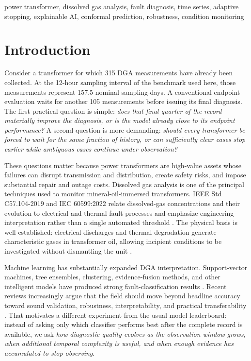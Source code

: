 \documentclass[conference]{IEEEtran}
\begin{document}
\begin{IEEEkeywords}
power transformer, dissolved gas analysis, fault diagnosis, time series, adaptive stopping, explainable AI, conformal prediction, robustness, condition monitoring
\end{IEEEkeywords}

\section{Introduction}
Consider a transformer for which 315 DGA measurements have already been collected. At the 12-hour sampling interval of the benchmark used here, those measurements represent 157.5 nominal sampling-days. A conventional endpoint evaluation waits for another 105 measurements before issuing its final diagnosis. The first practical question is simple: \emph{does that final quarter of the record materially improve the diagnosis, or is the model already close to its endpoint performance?} A second question is more demanding: \emph{should every transformer be forced to wait for the same fraction of history, or can sufficiently clear cases stop earlier while ambiguous cases continue under observation?}

These questions matter because power transformers are high-value assets whose failures can disrupt transmission and distribution, create safety risks, and impose substantial repair and outage costs. Dissolved gas analysis is one of the principal techniques used to monitor mineral-oil-immersed transformers. IEEE Std C57.104-2019 and IEC 60599:2022 relate dissolved-gas concentrations and their evolution to electrical and thermal fault processes and emphasize engineering interpretation rather than a single automated threshold \cite{ieeeC57104,iec60599}. The physical basis is well established: electrical discharges and thermal degradation generate characteristic gases in transformer oil, allowing incipient conditions to be investigated without dismantling the unit \cite{rogers1978,cheng2018survey,ali2023review,nanfak2024review}.

Machine learning has substantially expanded DGA interpretation. Support-vector machines, tree ensembles, clustering, evidence-fusion methods, and other intelligent models have produced strong fault-classification results \cite{zhang2019khsvm,shang2019hmsvm,liu2020dbscan,hechifa2024ensemble,lv2024lightgbm,zhang2022copula}. Recent reviews increasingly argue that the field should move beyond headline accuracy toward sound validation, robustness, interpretability, and practical transferability \cite{bouzar2026robustness}. That motivates a different experiment from the usual model leaderboard: instead of asking only which classifier performs best after the complete record is available, we ask \emph{how diagnostic quality evolves as the observation window grows, when additional temporal complexity is useful, and when enough evidence has accumulated to stop observing}.
\end{document}

